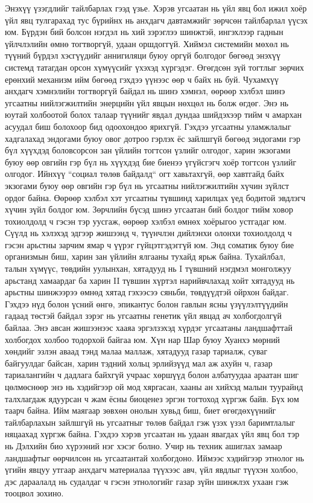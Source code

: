 Энэхүү үзэгдлийг тайлбарлах гээд үзье. Хэрэв угсаатан нь үйл явц бол ижил хоёр үйл явц тулгарахад тус бүрийнх нь анхдагч давтамжийг зөрчсөн тайлбарлал үүсэх юм. Бүрдэн бий болсон нэгдэл нь хий зэрэглээ шинжтэй, ингэхлээр гаднын үйлчлэлийн өмнө тогтворгүй, удаан оршдоггүй. Хиймэл системийн мөхөл нь түүний бүрдэл хэсгүүдийг аннигиляци буюу оргүй болгодог бөгөөд энэхүү системд татагдан орсон хүмүүсийг үхэхэд хүргэдэг. Өгөгдсөн зүй тогтлыг зөрчих ерөнхий механизм ийм бөгөөд гэхдээ үүнээс өөр ч байх нь буй. Чухамхүү анхдагч хэмнэлийн тогтворгүй байдал нь шинэ хэмнэл, өөрөөр хэлбэл шинэ угсаатны нийлэгжилтийн энерцийн үйл явцын нөхцөл нь болж өгдөг. Энэ нь юутай холбоотой болох талаар түүнийг явдал дундаа шийдэхээр тийм ч амархан асуудал биш болохоор бид одоохондоо ярихгүй. Гэхдээ угсаатны уламжлалыг хадгалахад эндогами буюу овог дотроо гэрлэх ёс зайлшгүй бөгөөд эндогами гэр бүл хүүхдэд боловсорсон зан үйлийн тогтсон үзлийг олгодог, харин экзогами буюу өөр овгийн гэр бүл нь хүүхдэд бие биенээ үгүйсгэгч хоёр тогтсон үзлийг олгодог. Ийнхүү “социал төлөв байдалд“ огт хавьтахгүй, өөр хавтгайд байх экзогами буюу өөр овгийн гэр бүл нь угсаатны нийлэгжилтийн хүчин зүйлст ордог байна. Өөрөөр хэлбэл хэт угсаатны түвшинд харилцах үед бодитой эвдлэгч хүчин зүйл болдог юм. Зөрчлийн бүсэд шинэ угсаатан бий болдог тийм ховор тохиолдолд ч гэсэн тэр уусгаж, өөрөөр хэлбэл өмнөх хоёрыгоо устгадаг юм. Сүүлд нь хэлэхэд эдгээр жишээнд ч, түүнчлэн дийлэнхи олонхи тохиолдолд ч гэсэн арьстны зарчим ямар ч үүрэг гүйцэтгэдэггүй юм. Энд соматик буюу бие организмын биш, харин зан үйлийн ялгааны тухайд ярьж байна. Тухайлбал, талын хүмүүс, төвдийн уулынхан, хятадууд нь I түвшний нэгдмэл монголжуу арьстанд хамаардаг ба харин II түвшин хүртэл нарийвчлахад хойт хятадууд нь арьстны шинжээрээ өмнөд хятад гэхээсээ сяньби, төвдүүдтэй ойрхон байдаг. Гэхдээ нүд болон үсний өнгө, эпикантус болон гавлын ясны үзүүлэлтүүдийн гадаад төстэй байдал зэрэг нь угсаатны генетик үйл явцад ач холбогдолгүй байлаа.
Энэ авсан жишээнээс хааяа эргэлзэхэд хүрдэг угсаатаны ландшафттай холбогдох холбоо тодорхой байгаа юм. Хүн нар Шар буюу Хуанхэ мөрний хөндийг эзлэн аваад тэнд малаа маллаж, хятадууд газар тариалж, суваг байгуулдаг байсан, харин тэдний хольц эрлийзүүд мал аж ахуйн ч, газар тариалангийн ч дадлага байхгүй учраас хөршүүд болон албатуудаа араатан шиг цөлмөснөөр энэ нь хэдийгээр ой мод хяргасан, хааны ан хийхэд малын туурайнд талхлагдаж ядуурсан ч жам ёсны биоценез эргэн тогтоход хүргэж байв. Бүх юм таарч байна.
Ийм маягаар зөвхөн онолын хувьд биш, биет өгөгдөхүүнийг тайлбарлахын зайлшгүй нь угсаатныг төлөв байдал гэж үзэх үзэл баримтлалыг няцаахад хүргэж байна. Гэхдээ хэрэв угсаатан нь удаан явагдах үйл явц бол тэр нь Дэлхийн био хүрээний нэг хэсэг болно. Учир нь техник ашиглах замаар ландшафтыг өөрчилсөн нь угсаатантай холбогдоно. Иймээс хэдийгээр этнолог нь үгийн явцуу утгаар анхдагч материалаа түүхээс авч, үйл явдлыг түүхэн холбоо, дэс дараалалд нь судалдаг ч гэсэн этнологийг газар зүйн шинжлэх ухаан гэж тооцвол зохино.
